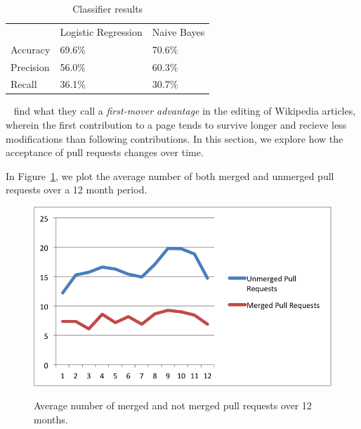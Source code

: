 \documentclass{iitthesis}
\begin{document}
\begin{table}[ht] \centering \label{tbl:classifiers}
  \caption{Classifier results}
  \begin{tabular}{lll}
  \hline\hline
  ~         & Logistic Regression & Naive Bayes \\
  Accuracy  & 69.6\%              & 70.6\%      \\
  Precision & 56.0\%              & 60.3\%      \\
  Recall    & 36.1\%              & 30.7\%      \\
  \hline
  \end{tabular}
\end{table}



 \label{sec:firstmover}

~\cite{viegas_studying_2004} find what they call a \textit{first-mover
advantage} in the editing of Wikipedia articles, wherein the first contribution
to a page tends to survive longer and recieve less modifications than following
contributions. In this section, we explore how the acceptance of pull requests
changes over time.

In Figure~\ref{fig:acceptance_over_time}, we plot the average number of both
merged and unmerged pull requests over a 12 month period.

\begin{figure}[p] \centering \label{fig:acceptance_over_time}
\includegraphics[scale=0.6]{figures/merged_over_time_excel.png}
\caption{Average number of merged and not merged pull requests over 12 months.}
\end{figure}

\clearpage


%
%

\appendix

%
%




\end{document}
